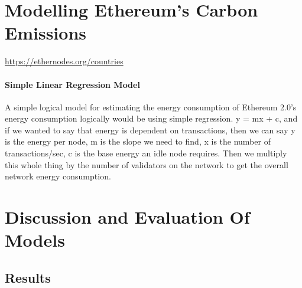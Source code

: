 \section {Modelling Ethereum's Carbon Emissions}
\url{https://ethernodes.org/countries}

\paragraph{ Simple Linear Regression Model}
A simple logical model for estimating the energy consumption of Ethereum 2.0's energy consumption logically would be using simple regression. y = mx + c, and if we wanted to say that energy is dependent on transactions, then we can say y is the energy per node, m is the slope we need to find, x is the number of transactions/sec, c is the base energy an idle node requires. Then we multiply this whole thing by the number of validators on the network to get the overall network energy consumption.

\section{Discussion and Evaluation Of Models}
\subsection{Results}







